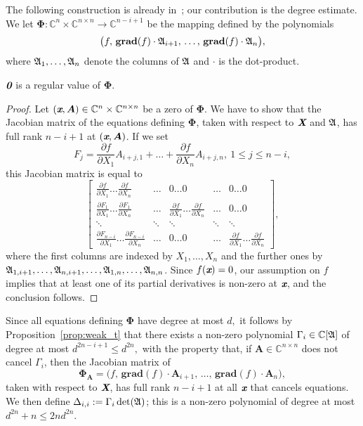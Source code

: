 \documentclass[sigconf]{acmart}
\def\bz{\textit{\textbf{0}}}
\def\Xb{\textit{\textbf{X}}}
\def\mA{{\bm A}}
\def\xb{\textit{\textbf{x}}}
\def\C{\mathbb{C}}
\def\grad{\textbf{grad}}
\def\pa{\partial}
\def\A{\frak{A}}
\begin{document}
The following construction is already in~\cite{BaGiHeMb97}; our
contribution is the degree estimate. We let $\bm\Phi: \C^n \times
\C^{n\times n} \to \C^{n-i+1}$ be the mapping defined by the
polynomials 
\[
  \big( f,\,\grad(f)\cdot \A_{i+1},\,\hdots,\, \grad(f)\cdot \A_n \big ),
\] 
where $\A_1,\hdots,\A_n$ denote the columns of $\A$ and $\cdot$ is the dot-product.
\begin{lemma} 
  $\bz$ is a regular value of $\bm\Phi$.
\end{lemma}
\begin{proof}
Let $(\xb,\mA) \in \C^n \times \C^{n\times n}$ be a zero of $\bm\Phi$.
We have to show that the Jacobian matrix of the equations defining
$\bm \Phi$, taken with respect to $\Xb$ and $\A$, has full rank
$n-i+1$ at $(\xb,\mA)$.
If we set 
\[
F_j = \frac{\pa f}{\pa X_1} A_{i+j,1} + \hdots + \frac{\pa f}{\pa X_n}A_{i+j,n}, ~1 \leq j \leq n-i,
\]
this Jacobian matrix is equal to
{\small \[
\left[ 
\begin{array}{cccccc}
\frac{\pa f}{\pa X_1} \hdots \frac{\pa f}{\pa X_n}             &\hdots& 0 \hdots 0                                         & \hdots & 0\hdots 0 \\ 
\frac{\pa F_{1}}{\pa X_1}\hdots \frac{\pa F_{1}}{\pa X_n}      &\hdots& \frac{\pa f}{\pa X_1} \hdots \frac{\pa f}{\pa X_n} & \hdots & 0\hdots 0 \\
\ddots                                                         &\ddots&\ddots                                              & \ddots & \ddots \\
\frac{\pa F_{n-i}}{\pa X_1}\hdots \frac{\pa F_{n-i}}{\pa X_n}  &\hdots&0 \hdots 0&  \hdots & \frac{\pa f}{\pa X_1} \hdots \frac{\pa f}{\pa X_n}  
\end{array}
\right],
\]}
where the first columns are indexed by $X_1,\dots,X_n$ and the further
ones by $\A_{1,i+1},\dots,\A_{n,i+1},\dots,\A_{1,n},\dots,\A_{n,n}$.
Since $f(\xb)=0$, our assumption on $f$ implies that at least one of
its partial derivatives is non-zero at $\xb$, and the conclusion
follows.
\end{proof}
Since all equations defining $\bm \Phi$ have degree at most $d,$ it
follows by Proposition~\ref{prop:weak_t} that there exists a non-zero
polynomial $\Gamma_i \in \C[\A]$ of degree at most $d^{2n-i+1}\leq
d^{2n},$ with the property that, if $\mA \in \C^{n\times n}$ does not
cancel $\Gamma_i$, then the Jacobian matrix of $$\bm\Phi_\mA=\big(
f,\,\grad(f)\cdot \mA_{i+1},\,\hdots,\, \grad(f)\cdot \mA_n \big ),$$
taken with respect to $\Xb$, has full rank $n-i+1$ at all $\xb$ that
cancels equations. We then define $\Delta_{i,i}:=\Gamma_i
\det(\A)$; this is a non-zero polynomial of degree at most $d^{2n}+n
\le 2nd^{2n}$.
\end{document}
